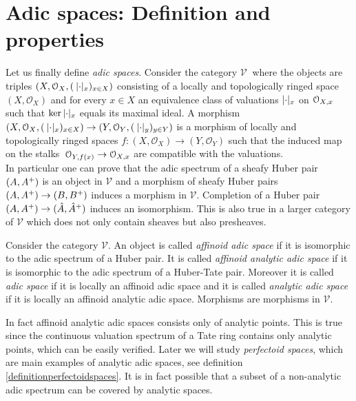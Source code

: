 \section{Adic spaces: Definition and properties}

 
Let us finally define \emph{adic spaces}. Consider the category $\mathcal{V}\:$ where the objects are triples $(X, \mathcal{O}_X, (\:{\lvert\cdot\rvert_{x}})_{x\in X})$ consisting of
a locally and topologically ringed space $(X, \mathcal{O}_X)$ and for every $x\in X$ an equivalence class of valuations $\lvert\cdot\rvert_{x}$ on $\mathcal{O}_{X,x}$ such that $\ker{\lvert\cdot\rvert_{x}}$ equals its maximal ideal.
A morphism $(X, \mathcal{O}_X, (\:{\lvert\cdot\rvert_{x}})_{x\in X})\to(Y, \mathcal{O}_Y, (\:{\lvert\cdot\rvert_{y}})_{y\in Y})$ is a morphism of locally and topologically ringed spaces $f\colon (X, \mathcal{O}_X)\to(Y, \mathcal{O}_Y)$ such that the induced map on the stalks $\:\mathcal{O}_{Y,f(x)}\to\mathcal{O}_{X,x}$ are compatible with the valuations.\\


In particular one can prove that the adic spectrum of a sheafy Huber pair $(A, A{^{+}})$ is an object in $\mathcal{V}$
and a morphism of sheafy Huber pairs $(A, A{^{+}})\to(B, B{^{+}})$ induces a morphism in $\mathcal{V}$.
Completion of a Huber pair $(A, A{^{+}})\to(\hat{A}, \hat{A}{^{+}})$ induces an isomorphism. This is also true in a larger category of $\mathcal{V}$ which does not only contain sheaves but also presheaves.
\clearpage


\begin{definition}
Consider the category $\mathcal{V}$. An object is called
\emph{affinoid adic space} if it is isomorphic to the adic spectrum of a Huber pair. It is called
\emph{affinoid analytic adic space} if it is isomorphic to the adic spectrum of a Huber-Tate pair.
Moreover it is called \emph{adic space} if it is locally an affinoid adic space and it is called
\emph{analytic adic space} if it is locally an affinoid analytic adic space. Morphisms are morphisms in $\mathcal{V}$.
\end{definition}
In fact affinoid analytic adic spaces consists only of analytic points. This is true since the continuous valuation spectrum of a Tate ring contains only analytic points, which can be easily verified. Later we will study \emph{perfectoid spaces}, which are main examples of analytic adic spaces, see definition \ref{definitionperfectoidspaces}. It is in fact possible that a subset of a non-analytic adic spectrum can be covered by analytic spaces.\\





